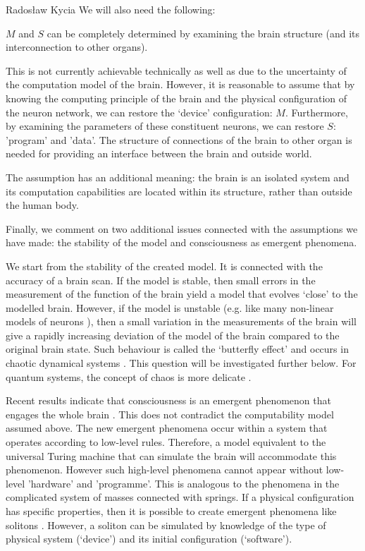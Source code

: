 \begin{artengenv}{Radosław Kycia}
We will also need the following:
\begin{Assumption}
\label{Assumption_mapping}
  $M$ and $S$ can be completely determined by examining the brain structure (and its interconnection to other organs).
\end{Assumption}
This is not currently achievable technically as well as due to the uncertainty of the computation model of the brain. However, it is reasonable to assume that by knowing the computing principle of the brain and the physical configuration of the neuron network, we can restore the `device' configuration: $M$. Furthermore, by examining the parameters of these constituent neurons, we can restore $S$: 'program' and 'data'. The structure of connections of the brain to other organ is needed for providing an interface between the brain and outside world. 

The assumption has an additional meaning: the brain is an isolated system and its computation capabilities are located within its structure, rather than outside the human body.
	
Finally, we comment on two additional issues connected with the assumptions we have made: the stability of the model and consciousness as emergent phenomena.


We start from the stability of the created model. It is connected with the accuracy of a brain scan. If the model is stable, then small errors in the measurement of the function of the brain yield a model that evolves `close' to the modelled brain. However, if the model is unstable (e.g. like many non-linear models of neurons \parencite{ModellingNeurons}), then a small variation in the measurements of the brain will give a rapidly increasing deviation of the model of the brain compared to the original brain state. Such behaviour is called the `butterfly effect' and occurs in chaotic dynamical systems \parencite{ModellingNeurons, Ott}. This question will be investigated further below. For quantum systems, the concept of chaos is more delicate \parencite{Ott}.

Recent results indicate that consciousness is an emergent phenomenon that engages the whole brain \parencite{EmergentBrain}. This does not contradict the computability model assumed above. The new emergent phenomena occur within a system that operates according to low-level rules. Therefore, a model equivalent to the universal Turing machine that can simulate the brain will accommodate this phenomenon. However such high-level phenomena cannot appear without low-level 'hardware' and 'programme'. This is analogous to the phenomena in the complicated system of masses connected with springs. If a physical configuration has specific properties, then it is possible to create emergent phenomena like solitons \parencite{Ott}. However, a soliton can be simulated by knowledge of the type of physical system (`device') and its initial configuration (`software').



\end{artengenv}
